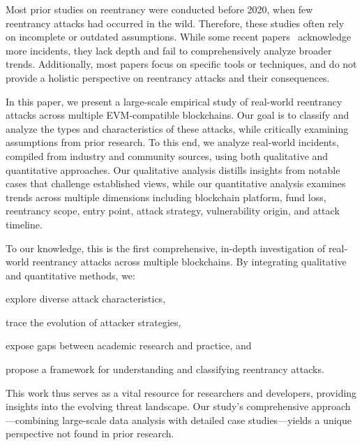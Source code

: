 Most prior studies on reentrancy were conducted before 2020, when few reentrancy attacks had occurred in the wild. Therefore, these studies often rely on incomplete or outdated assumptions. While some recent papers~\cite{attack-contract-detection,turn-the-rudder} acknowledge more incidents, they lack depth and fail to comprehensively analyze broader trends. Additionally, most papers focus on specific tools or techniques, and do not provide a holistic perspective on reentrancy attacks and their consequences.

In this paper, we present a large-scale empirical study of real-world reentrancy attacks across multiple EVM-compatible blockchains. Our goal is to classify and analyze the types and characteristics of these attacks, while critically examining assumptions from prior research. To this end, we analyze \ReentrancyTotalAnalyzed{} real-world incidents, compiled from industry and community sources, using both qualitative and quantitative approaches. Our qualitative analysis distills insights from notable cases that challenge established views, while our quantitative analysis examines trends across multiple dimensions including blockchain platform, fund loss, reentrancy scope, entry point, attack strategy, vulnerability origin, and attack timeline.

To our knowledge, this is the first comprehensive, in-depth investigation of real-world reentrancy attacks across multiple blockchains. By integrating qualitative and quantitative methods, we:
\begin{enumerate*}
    \item explore diverse attack characteristics,
    \item trace the evolution of attacker strategies,
    \item expose gaps between academic research and practice, and
    \item propose a framework for understanding and classifying reentrancy attacks.
\end{enumerate*}

This work thus serves as a vital resource for researchers and developers, providing insights into the evolving threat landscape. %
Our study's comprehensive approach—combining large-scale data analysis with detailed case studies—yields a unique perspective not found in prior research.

